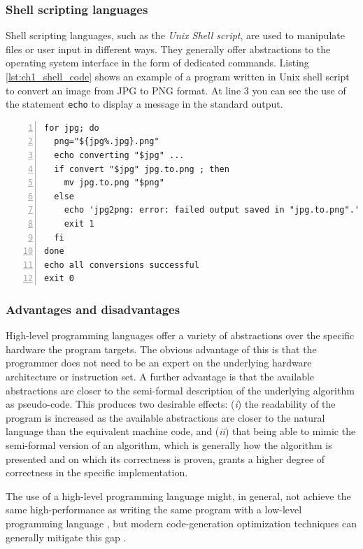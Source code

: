 \subsubsection*{Shell scripting languages}
Shell scripting languages, such as the \textit{Unix Shell script}, are used to manipulate files or user input in different ways. They generally offer abstractions to the operating system interface in the form of dedicated commands. Listing \ref{lst:ch1_shell_code} shows an example of a program written in Unix shell script to convert an image from JPG to PNG format. At line 3 you can see the use of the statement \texttt{echo} to display a message in the standard output.

\begin{lstlisting}[numbers = left, caption = Unix shell code, label = lst:ch1_shell_code]
for jpg; do                                  
  png="${jpg%.jpg}.png"                    
  echo converting "$jpg" ...               
  if convert "$jpg" jpg.to.png ; then      
    mv jpg.to.png "$png"                 
  else                                     
    echo 'jpg2png: error: failed output saved in "jpg.to.png".' >&2
    exit 1
  fi                                       
done                                         
echo all conversions successful              
exit 0
\end{lstlisting}

\subsubsection*{Advantages and disadvantages}
High-level programming languages offer a variety of abstractions over the specific hardware the program targets. The obvious advantage of this is that the programmer does not need to be an expert on the underlying hardware architecture or instruction set. A further advantage is that the available abstractions are closer to the semi-formal description of the underlying algorithm as pseudo-code. This produces two desirable effects: (\textit{i}) the readability of the program is increased as the available abstractions are closer to the natural language than the equivalent machine code, and (\textit{ii}) that being able to mimic the semi-formal version of an algorithm, which is generally how the algorithm is presented and on which its correctness is proven, grants a higher degree of correctness in the specific implementation.

The use of a high-level programming language might, in general, not achieve the same high-performance as writing the same program with a low-level programming language  \cite{chatzigeorgiou2002evaluating}, but modern code-generation optimization techniques can generally mitigate this gap \cite{amarasinghe1993communication, wang2007code}.

